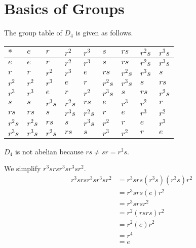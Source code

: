 \section{Basics of Groups}
\begin{questions}
    \item The group table of $D_4$ is given as follows.
    \begin{table}[H]
        \centering
        \begin{tabular}{|l|l|l|l|l|l|l|l|l|}
        \hline
        $\ast$ & $e$    & $r$    & $r^2$  & $r^3$  & $s$    & $rs$   & $r^2s$ & $r^3s$ \\ \hline
        $e$    & $e$    & $r$    & $r^2$  & $r^3$  & $s$    & $rs$   & $r^2s$ & $r^3s$ \\ \hline
        $r$    & $r$    & $r^2$  & $r^3$  & $e$    & $rs$   & $r^2s$ & $r^3s$ & $s$    \\ \hline
        $r^2$  & $r^2$  & $r^3$  & $e$    & $r$    & $r^2s$ & $r^3s$ & $s$    & $rs$   \\ \hline
        $r^3$  & $r^3$  & $e$    & $r$    & $r^2$  & $r^3s$ & $s$    & $rs$   & $r^2s$ \\ \hline
        $s$    & $s$    & $r^3s$ & $r^2s$ & $rs$   & $e$    & $r^3$  & $r^2$  & $r$    \\ \hline
        $rs$   & $rs$   & $s$    & $r^3s$ & $r^2s$ & $r$    & $e$    & $r^3$  & $r^2$  \\ \hline
        $r^2s$ & $r^2s$ & $rs$   & $s$    & $r^3s$ & $r^2$  & $r$    & $e$    & $r^3$  \\ \hline
        $r^3s$ & $r^3s$ & $r^2s$ & $rs$   & $s$    & $r^3$  & $r^2$  & $r$    & $e$    \\ \hline
        \end{tabular}
    \end{table}
    \begin{partquestions}{\alph*}
        \item $D_4$ is not abelian because $rs \neq sr = r^3s$.
        \item We simplify $r^3srsr^3sr^3sr^2$.
        \begin{align*}
            r^3 sr sr^3 sr^3 sr^2 &= r^3srs(r^3s)(r^3s)r^2\\
            &= r^3 srs(e)r^2\\
            &= r^3 sr sr^2\\
            &= r^2(rs rs)r^2\\
            &= r^2(e)r^2\\
            &= r^4\\
            &= e
        \end{align*}
    \end{partquestions}


\end{questions}
